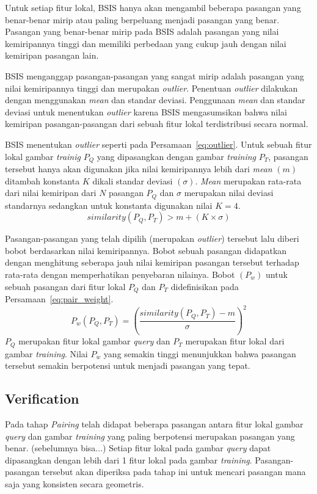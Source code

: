 Untuk setiap fitur lokal, BSIS hanya akan mengambil beberapa pasangan yang benar-benar mirip atau paling berpeluang menjadi pasangan yang benar. Pasangan yang benar-benar mirip pada BSIS adalah pasangan yang nilai kemiripannya tinggi dan memiliki perbedaan yang cukup jauh dengan nilai kemiripan pasangan lain. 

BSIS menganggap pasangan-pasangan yang sangat mirip adalah pasangan yang nilai kemiripannya tinggi dan merupakan \textit{outlier}. Penentuan \textit{outlier} dilakukan dengan menggunakan \textit{mean} dan standar deviasi. Penggunaan \textit{mean} dan standar deviasi untuk menentukan \textit{outlier} karena BSIS mengasumsikan bahwa nilai kemiripan pasangan-pasangan dari sebuah fitur lokal terdistribusi secara normal. 

BSIS menentukan \textit{outlier} seperti pada Persamaan~\ref{eq:outlier}. Untuk sebuah fitur lokal gambar \textit{trainig} $P_Q$ yang dipasangkan dengan gambar \textit{training} $P_T$, pasangan tersebut hanya akan digunakan jika nilai kemiripannya lebih dari \textit{mean} $(m)$ ditambah konstanta $K$ dikali standar deviasi $(\sigma)$. \textit{Mean} merupakan rata-rata dari nilai kemiripan dari $N$ pasangan $P_Q$ dan $\sigma$ merupakan nilai deviasi standarnya sedangkan untuk konstanta digunakan nilai $K=4$.
\begin{equation}
	\label{eq:outlier}
	similarity(P_Q, P_T) > m + (K \times \sigma)
\end{equation}

Pasangan-pasangan yang telah dipilih (merupakan \textit{outlier}) tersebut lalu diberi bobot berdasarkan nilai kemiripannya. Bobot sebuah pasangan didapatkan dengan menghitung seberapa jauh nilai kemiripan pasangan tersebut terhadap rata-rata dengan memperhatikan penyebaran nilainya. Bobot $(P_w)$ untuk sebuah pasangan dari fitur lokal $P_Q$ dan $P_T$ didefinisikan pada Persamaan~\ref{eq:pair_weight}.
\begin{equation}
	\label{eq:pair_weight}
	P_w(P_Q, P_T)=(\frac{similarity(P_Q, P_T) - m}{\sigma})^2
\end{equation}
$P_Q$ merupakan fitur lokal gambar \textit{query} dan $P_T$ merupakan fitur lokal dari gambar \textit{training}. Nilai $P_w$ yang semakin tinggi menunjukkan bahwa pasangan tersebut semakin berpotensi untuk menjadi pasangan yang tepat.

\subsection{Verification}
Pada tahap \textit{Pairing} telah didapat beberapa pasangan antara fitur lokal gambar \textit{query} dan gambar \textit{training} yang paling berpotensi merupakan pasangan yang benar. (sebelumnya bisa...) Setiap fitur lokal pada gambar \textit{query} dapat dipasangkan dengan lebih dari 1 fitur lokal pada gambar \textit{training}. Pasangan-pasangan tersebut akan diperiksa pada tahap ini untuk mencari pasangan mana saja yang konsisten secara geometris.

